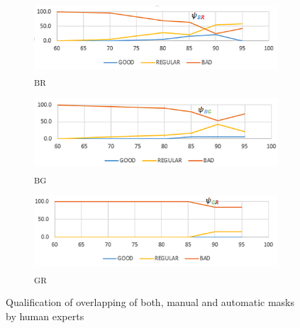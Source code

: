 \begin{figure}[h!]
     \centering
     \begin{subfigure}[b]{\textwidth}
         \centering
         \includegraphics[width=\textwidth]{Imagenes/psiBR.png}
         \caption{\textpsi \textsubscript{BR}}
         \label{psiBR}
     \end{subfigure}
     \hfill
     \begin{subfigure}[b]{\textwidth}
         \centering
         \includegraphics[width=\textwidth]{Imagenes/psiBG.png}
         \caption{\textpsi \textsubscript{BG}}
         \label{psiBG}
     \end{subfigure}
     \hfill
     \begin{subfigure}[b]{\textwidth}
         \centering
         \includegraphics[width=\textwidth]{Imagenes/psiGR.png}
         \caption{\textpsi \textsubscript{GR}}
         \label{psiGR}
     \end{subfigure}
        \caption{Qualification of overlapping of both, manual and automatic masks by human experts}
        \label{humanscoring}
\end{figure}